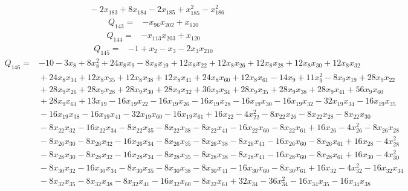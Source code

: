{\begin{align*}
 &{}-2x_{183} +8x_{184} -2x_{185} +x_{185}^{2} -x_{186}^{2}
\end{align*}
\begin{align*}
 Q_{143}={}&-x_{96}x_{202} +x_{120}
\end{align*}
\begin{align*}
 Q_{144}={}&-x_{113}x_{203} +x_{120}
\end{align*}
\begin{align*}
 Q_{145}={}&-1 +x_{2} -x_{3} -2x_{3}x_{210}
\end{align*}
\begin{align*}
 Q_{146}={}&-10 -3x_{8} +8x_{8}^{2} +24x_{8}x_{9} -8x_{8}x_{19} +12x_{8}x_{22} +12x_{8}x_{26} +12x_{8}x_{28} +12x_{8}x_{30} +12x_{8}x_{32}\\
 &{}+24x_{8}x_{34} +12x_{8}x_{35} +12x_{8}x_{38} +12x_{8}x_{41} +24x_{8}x_{60} +12x_{8}x_{61} -14x_{9} +11x_{9}^{2} -8x_{9}x_{19} +28x_{9}x_{22}\\
 &{}+28x_{9}x_{26} +28x_{9}x_{28} +28x_{9}x_{30} +28x_{9}x_{32} +36x_{9}x_{34} +28x_{9}x_{35} +28x_{9}x_{38} +28x_{9}x_{41} +56x_{9}x_{60}\\
 &{}+28x_{9}x_{61} +13x_{19} -16x_{19}x_{22} -16x_{19}x_{26} -16x_{19}x_{28} -16x_{19}x_{30} -16x_{19}x_{32} -32x_{19}x_{34} -16x_{19}x_{35}\\
 &{}-16x_{19}x_{38} -16x_{19}x_{41} -32x_{19}x_{60} -16x_{19}x_{61} +16x_{22} -4x_{22}^{2} -8x_{22}x_{26} -8x_{22}x_{28} -8x_{22}x_{30}\\
 &{}-8x_{22}x_{32} -16x_{22}x_{34} -8x_{22}x_{35} -8x_{22}x_{38} -8x_{22}x_{41} -16x_{22}x_{60} -8x_{22}x_{61} +16x_{26} -4x_{26}^{2} -8x_{26}x_{28}\\
 &{}-8x_{26}x_{30} -8x_{26}x_{32} -16x_{26}x_{34} -8x_{26}x_{35} -8x_{26}x_{38} -8x_{26}x_{41} -16x_{26}x_{60} -8x_{26}x_{61} +16x_{28} -4x_{28}^{2}\\
 &{}-8x_{28}x_{30} -8x_{28}x_{32} -16x_{28}x_{34} -8x_{28}x_{35} -8x_{28}x_{38} -8x_{28}x_{41} -16x_{28}x_{60} -8x_{28}x_{61} +16x_{30} -4x_{30}^{2}\\
 &{}-8x_{30}x_{32} -16x_{30}x_{34} -8x_{30}x_{35} -8x_{30}x_{38} -8x_{30}x_{41} -16x_{30}x_{60} -8x_{30}x_{61} +16x_{32} -4x_{32}^{2} -16x_{32}x_{34}\\
 &{}-8x_{32}x_{35} -8x_{32}x_{38} -8x_{32}x_{41} -16x_{32}x_{60} -8x_{32}x_{61} +32x_{34} -36x_{34}^{2} -16x_{34}x_{35} -16x_{34}x_{38}\\

\end{align*}}
